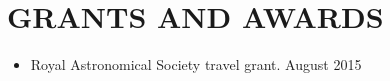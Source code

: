 \section{\textbf{\color{RoyalBlue}GRANTS AND AWARDS}}
\begin{itemize}
\item Royal Astronomical Society travel grant. \hfill August 2015
\end{itemize}
